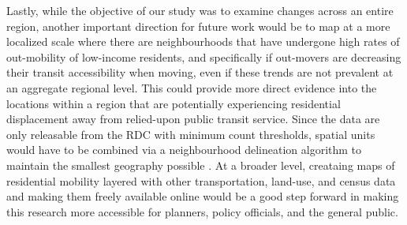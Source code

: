 Lastly, while the objective of our study was to examine changes across an entire region, another important direction for future work would be to map at a more localized scale where there are neighbourhoods that have undergone high rates of out-mobility of low-income residents, and specifically if out-movers are decreasing their transit accessibility when moving, even if these trends are not prevalent at an aggregate regional level. This could provide more direct evidence into the locations within a region that are potentially experiencing residential displacement away from relied-upon public transit service. Since the data are only releasable from the RDC with minimum count thresholds, spatial units would have to be combined via a neighbourhood delineation algorithm to maintain the smallest geography possible \cite{folch_identifying_2014, wei_efficient_2021}.  At a broader level, creataing maps of residential mobility layered with other transportation, land-use, and census data and making them freely available online would be a good step forward in making this research more accessible for planners, policy officials, and the general public.

%
%
%
%
%
%
%
%

















